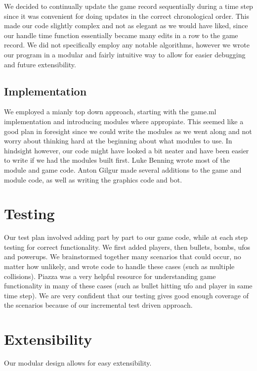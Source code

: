 \documentclass{article}
\begin{document}
We decided to continually update the game record sequentially during a time step since it was convenient for doing updates in the correct chronological order. This made our code slightly complex and not as elegant as we would have liked, since our handle time function essentially became many edits in a row to the game record. We did not specifically employ any notable algorithms, however we wrote our program in a modular and fairly intuitive way to allow for easier debugging and future extensibility. 

\subsection{Implementation}
We employed a mianly top down approach, starting with the game.ml implementation and introducing modules where appropiate. This seemed like a good plan in foresight since we could write the modules as we went along and not worry about thinking hard at the beginning about what modules to use. In hindsight however, our code might have looked a bit neater and have been easier to write if we had the modules built first. Luke Benning wrote most of the module and game code. Anton Gilgur made several additions to the game and module code, as well as writing the graphics code and bot.

\section{Testing}
Our test plan involved adding part by part to our game code, while at each step testing for correct functionality. We first added players, then bullets, bombs, ufos and powerups. We brainstormed together many scenarios that could occur, no matter how unlikely, and wrote code to handle these cases (such as multiple collisions). Piazza was a very helpful resource for understanding game functionality in many of these cases (such as bullet hitting ufo and player in same time step). We are very confident that our testing gives good enough coverage of the scenarios because of our incremental test driven approach.

\section{Extensibility}

Our modular design allows for easy extensibility.
\end{document}
